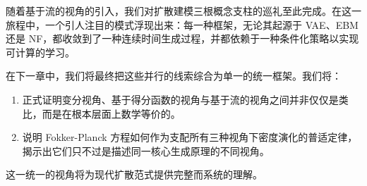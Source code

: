 随着基于流的视角的引入，我们对扩散建模三根概念支柱的巡礼至此完成。在这一旅程中，一个引人注目的模式浮现出来：每一种框架，无论其起源于 VAE、EBM 还是 NF，都收敛到了一种连续时间生成过程，并都依赖于一种条件化策略以实现可计算的学习。

在下一章中，我们将最终把这些并行的线索综合为单一的统一框架。我们将：
\begin{enumerate}
    \item 正式证明变分视角、基于得分函数的视角与基于流的视角之间并非仅仅是类比，而是在根本层面上数学等价的。
    \item 说明 Fokker-Planck 方程如何作为支配所有三种视角下密度演化的普适定律，揭示出它们只不过是描述同一核心生成原理的不同视角。
\end{enumerate}

这一统一的视角将为现代扩散范式提供完整而系统的理解。

